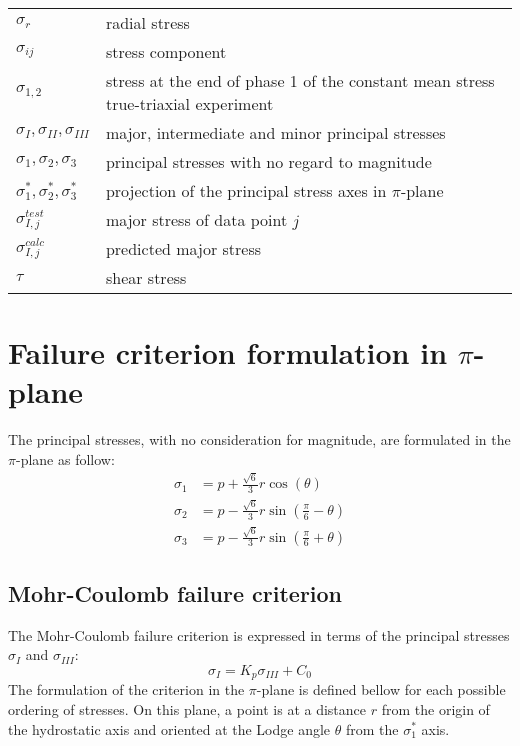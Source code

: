 \begin{table}
\begin{tabular}{ll}
        $\sigma_r$ & radial stress \\
        $\sigma_{ij}$ & stress component \\
        $\sigma_{1,2}$ & stress at the end of phase 1 of the constant mean stress true-triaxial experiment \\
        $\sigma_{I},\sigma_{II},\sigma_{III} $ & major, intermediate and minor principal stresses\\
        $\sigma_{1},\sigma_{2},\sigma_{3} $ & principal stresses with no regard to magnitude\\
        $\sigma_{1}^*,\sigma_{2}^*,\sigma_{3}^* $ & projection of the principal stress axes in $\pi$-plane \\
        $\sigma_{I,j}^{test}$ & major stress of data point $j$ \\
        $\sigma_{I,j}^{calc}$ & predicted major stress \\
        $\tau$ & shear stress \\
    \end{tabular}
\end{table}

\chapter{Failure criterion formulation in \texorpdfstring{$\pi$}{pi}-plane}\label{App:B}

The principal stresses, with no consideration for magnitude, are formulated in the $\pi$-plane as follow: 
\begin{align}
    \sigma_1 &= p + \frac{\sqrt{6}}{3}r\cos\left(\theta\right) \\
    \sigma_2 &= p - \frac{\sqrt{6}}{3}r\sin\left(\frac{\pi}{6}-\theta\right)\\
    \sigma_3 &= p - \frac{\sqrt{6}}{3}r\sin\left(\frac{\pi}{6}+\theta\right)
\end{align}

\section*{Mohr-Coulomb failure criterion}
The Mohr-Coulomb failure criterion is expressed in terms of the principal stresses $\sigma_I$ and $\sigma_{III}$:
\begin{equation}
    \sigma_I = K_p \sigma_{III} + C_0
\end{equation}
The formulation of the criterion in the $\pi$-plane is defined bellow for each possible ordering of stresses. On this plane, a point is at a distance $r$ from the origin of the hydrostatic axis and oriented at the Lodge angle $\theta$ from the  $\sigma_1^*$ axis.


